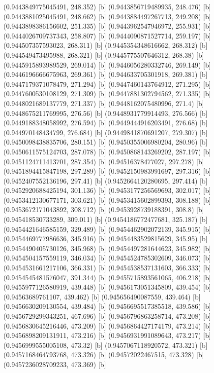 {{{(0.9443849775045491, 248.352) [b] 
(0.9443856719489935, 248.476) [b] 
(0.9443881025045491, 248.662) [b] 
(0.9443884497267713, 249.208) [b] 
(0.9443898386156602, 251.335) [b] 
(0.9443962547946972, 255.931) [b] 
(0.9444026709737343, 258.807) [b] 
(0.9444090871527714, 259.197) [b] 
(0.944507357593023, 268.311) [b] 
(0.9445354348616662, 268.312) [b] 
(0.944549473495988, 268.321) [b] 
(0.9445775507646312, 268.38) [b] 
(0.9445915893989529, 269.014) [b] 
(0.9446056280332746, 269.149) [b] 
(0.9446196666675963, 269.361) [b] 
(0.944633705301918, 269.381) [b] 
(0.9447179371078479, 271.294) [b] 
(0.9447460143764912, 271.295) [b] 
(0.9447600530108129, 271.309) [b] 
(0.9447881302794562, 271.335) [b] 
(0.9448021689137779, 271.337) [b] 
(0.9448162075480996, 271.4) [b] 
(0.9448675211769995, 276.56) [b] 
(0.9448931779914493, 276.566) [b] 
(0.9449188348058992, 276.594) [b] 
(0.9449444916203491, 276.68) [b] 
(0.944970148434799, 276.684) [b] 
(0.9449841870691207, 279.307) [b] 
(0.9450098438835706, 280.151) [b] 
(0.9450355006980204, 280.96) [b] 
(0.9450611575124703, 287.078) [b] 
(0.9450868143269202, 287.197) [b] 
(0.9451124711413701, 287.354) [b] 
(0.94516378477027, 297.278) [b] 
(0.9451894415847198, 297.289) [b] 
(0.9452150983991697, 297.316) [b] 
(0.9452407552136196, 297.41) [b] 
(0.9452664120280695, 297.414) [b] 
(0.9452920688425194, 301.136) [b] 
(0.9453177256569693, 302.017) [b] 
(0.9453412130677171, 303.621) [b] 
(0.9453415602899393, 308.188) [b] 
(0.9453672171043892, 308.712) [b] 
(0.9453928739188391, 308.8) [b] 
(0.945418530733289, 309.011) [b] 
(0.9454186772477681, 325.187) [b] 
(0.9454421646585159, 329.489) [b] 
(0.9454462902072139, 345.915) [b] 
(0.9454469777986636, 345.916) [b] 
(0.9454483529815629, 345.95) [b] 
(0.9454490405730126, 345.968) [b] 
(0.9454497281644623, 345.982) [b] 
(0.9454504157559119, 346.034) [b] 
(0.9454524785302609, 346.073) [b] 
(0.9454531661217106, 366.331) [b] 
(0.9454538537131603, 366.333) [b] 
(0.9454545481576047, 391.344) [b] 
(0.9455715893561065, 406.218) [b] 
(0.9455977126580919, 439.448) [b] 
(0.9456173051345809, 439.454) [b] 
(0.94563689761107, 439.462) [b] 
(0.945656490087559, 439.464) [b] 
(0.9456630209130554, 439.484) [b] 
(0.9456695517385518, 439.586) [b] 
(0.9456729299343251, 467.696) [b] 
(0.9456796863258714, 473.208) [b] 
(0.9456830645216446, 473.209) [b] 
(0.9456864427174179, 473.214) [b] 
(0.9456898209131911, 473.216) [b] 
(0.9456931991089643, 473.217) [b] 
(0.9456999555005108, 473.32) [b] 
(0.9457067118920572, 473.321) [b] 
(0.9457168464793768, 473.326) [b] 
(0.94572022467515, 473.328) [b] 
(0.9457236028709233, 473.369) [b] 
}}}
